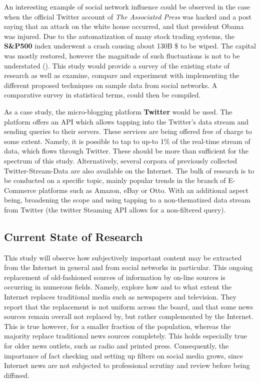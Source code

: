 		\par
		
		An interesting example of social network influence could be observed in the case when the official Twitter account of \textit{ The Associated Press} was hacked and a post saying that an attack on the white house occurred, and that president Obama was injured. Due to the automatization of many stock trading systems, the \textbf{S\&P500} index underwent a crash causing about 130B \$ to be wiped. The capital was mostly restored, however the magnitude of such fluctuations is not to be understated (\cite*{fake_post}). This study would provide a survey of the existing state of research as well as examine, compare and experiment with implementing the different proposed techniques on sample data from social networks. A comparative survey in statistical terms, could then be compiled.
		
		\par
		
		As a case study, the micro-blogging platform \textbf{Twitter} would be used. The platform offers an API which allows tapping into the Twitter's data stream and sending queries to their servers. These services are being offered free of charge to some extent. Namely, it is possible to tap to up-to 1\% of the real-time stream of data, which flows through Twitter. These should be more than sufficient for the spectrum of this study. Alternatively, several corpora of previously collected Twitter-Stream-Data are also available on the Internet. The bulk of research is to be conducted on  a specific topic, mainly popular trends in the branch of E-Commerce platforms such as Amazon, eBay or Otto. With an additional aspect being, broadening the scope and using tapping to a non-thematized data stream from Twitter (the twitter Steaming API allows for a non-filtered query).
		
	\subsection{Current State of Research}
		This study will observe how subjectively important content may be extracted from the Internet in general and from social networks in particular. This ongoing replacement of old-fashioned sources of information by on-line sources is occurring in numerous fields. Namely, \cite*{gaskins2012internet} explore how and to what extent the Internet replaces traditional media such as newspapers and television. They report that the replacement is not uniform across the board, and that some news sources remain overall not replaced by, but rather complemented by the Internet. This is true however, for a smaller fraction of the population, whereas the majority replace traditional news sources completely. This holds especially true for older news outlets, such as radio and printed press. Consequently, the importance of fact checking and setting up filters on social media grows, since Internet news are not subjected to professional scrutiny and review before being diffused.
		
